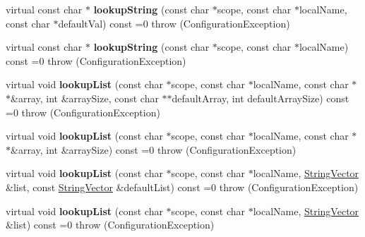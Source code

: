 \begin{DoxyCompactItemize}
\item 
\hypertarget{classCONFIG4CPP__NAMESPACE_1_1Configuration_a29c789b915ec62161af3f20f0e4f95cc}{virtual const char $\ast$ {\bfseries lookup\-String} (const char $\ast$scope, const char $\ast$local\-Name, const char $\ast$default\-Val) const =0  throw (\-Configuration\-Exception)}\label{classCONFIG4CPP__NAMESPACE_1_1Configuration_a29c789b915ec62161af3f20f0e4f95cc}

\item 
\hypertarget{classCONFIG4CPP__NAMESPACE_1_1Configuration_a8d44332a14b2e39dba5a1876ccafe034}{virtual const char $\ast$ {\bfseries lookup\-String} (const char $\ast$scope, const char $\ast$local\-Name) const =0  throw (\-Configuration\-Exception)}\label{classCONFIG4CPP__NAMESPACE_1_1Configuration_a8d44332a14b2e39dba5a1876ccafe034}

\item 
\hypertarget{classCONFIG4CPP__NAMESPACE_1_1Configuration_adcec7aa081ec51f9db73ccfecf57627f}{virtual void {\bfseries lookup\-List} (const char $\ast$scope, const char $\ast$local\-Name, const char $\ast$$\ast$\&array, int \&array\-Size, const char $\ast$$\ast$default\-Array, int default\-Array\-Size) const =0  throw (\-Configuration\-Exception)}\label{classCONFIG4CPP__NAMESPACE_1_1Configuration_adcec7aa081ec51f9db73ccfecf57627f}

\item 
\hypertarget{classCONFIG4CPP__NAMESPACE_1_1Configuration_a79804bbb433302ff8af28d5f9136c295}{virtual void {\bfseries lookup\-List} (const char $\ast$scope, const char $\ast$local\-Name, const char $\ast$$\ast$\&array, int \&array\-Size) const =0  throw (\-Configuration\-Exception)}\label{classCONFIG4CPP__NAMESPACE_1_1Configuration_a79804bbb433302ff8af28d5f9136c295}

\item 
\hypertarget{classCONFIG4CPP__NAMESPACE_1_1Configuration_ac74b044af14ff94efd5a2c9fba701e9a}{virtual void {\bfseries lookup\-List} (const char $\ast$scope, const char $\ast$local\-Name, \hyperlink{classCONFIG4CPP__NAMESPACE_1_1StringVector}{String\-Vector} \&list, const \hyperlink{classCONFIG4CPP__NAMESPACE_1_1StringVector}{String\-Vector} \&default\-List) const =0  throw (\-Configuration\-Exception)}\label{classCONFIG4CPP__NAMESPACE_1_1Configuration_ac74b044af14ff94efd5a2c9fba701e9a}

\item 
\hypertarget{classCONFIG4CPP__NAMESPACE_1_1Configuration_a521f2aab1656d6e5167a42d160dee252}{virtual void {\bfseries lookup\-List} (const char $\ast$scope, const char $\ast$local\-Name, \hyperlink{classCONFIG4CPP__NAMESPACE_1_1StringVector}{String\-Vector} \&list) const =0  throw (\-Configuration\-Exception)}\label{classCONFIG4CPP__NAMESPACE_1_1Configuration_a521f2aab1656d6e5167a42d160dee252}


\end{DoxyCompactItemize}
